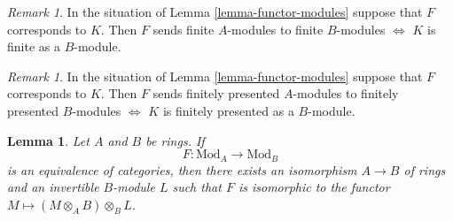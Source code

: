 \documentclass{stacks-project}
\theoremstyle{plain}
\newtheorem{lemma}[subsection]{Lemma}
\theoremstyle{definition}
\theoremstyle{remark}
\newtheorem{remark}[subsection]{Remark}
\numberwithin{equation}{subsection}
\begin{document}
\begin{remark}
\label{remark-finite}
In the situation of Lemma \ref{lemma-functor-modules}
suppose that $F$ corresponds to $K$. Then
$F$ sends finite $A$-modules to finite $B$-modules
$\Leftrightarrow$ $K$ is finite as a $B$-module.
\end{remark}

\begin{remark}
\label{remark-finite-presentation}
In the situation of Lemma \ref{lemma-functor-modules}
suppose that $F$ corresponds to $K$. Then
$F$ sends finitely presented $A$-modules to finitely presented $B$-modules
$\Leftrightarrow$ $K$ is finitely presented as a $B$-module.
\end{remark}

\begin{lemma}
\label{lemma-functor-equivalence}
Let $A$ and $B$ be rings. If
$$
F : \text{Mod}_A \longrightarrow \text{Mod}_B
$$
is an equivalence of categories, then there exists an isomorphism
$A \to B$ of rings and an invertible $B$-module $L$ such that
$F$ is isomorphic to the functor $M \mapsto (M \otimes_A B) \otimes_B L$.
\end{lemma}
\end{document}
